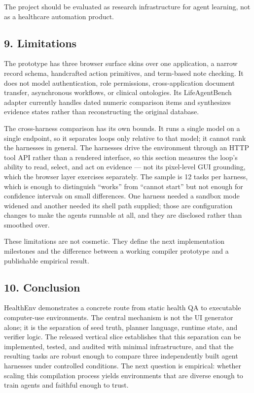 \documentclass[
]{article}
\begin{document}
The project should be evaluated as research infrastructure for agent
learning, not as a healthcare automation product.

\subsection{9. Limitations}\label{limitations}

The prototype has three browser surface skins over one application, a
narrow record schema, handcrafted action primitives, and term-based note
checking. It does not model authentication, role permissions,
cross-application document transfer, asynchronous workflows, or clinical
ontologies. Its LifeAgentBench adapter currently handles dated numeric
comparison items and synthesizes evidence states rather than
reconstructing the original database.

The cross-harness comparison has its own bounds. It runs a single model
on a single endpoint, so it separates loops only relative to that model;
it cannot rank the harnesses in general. The harnesses drive the
environment through an HTTP tool API rather than a rendered interface,
so this section measures the loop's ability to read, select, and act on
evidence --- not its pixel-level GUI grounding, which the browser layer
exercises separately. The sample is 12 tasks per harness, which is
enough to distinguish ``works'' from ``cannot start'' but not enough for
confidence intervals on small differences. One harness needed a sandbox
mode widened and another needed its shell path supplied; those are
configuration changes to make the agents runnable at all, and they are
disclosed rather than smoothed over.

These limitations are not cosmetic. They define the next implementation
milestones and the difference between a working compiler prototype and a
publishable empirical result.

\subsection{10. Conclusion}\label{conclusion}

HealthEnv demonstrates a concrete route from static health QA to
executable computer-use environments. The central mechanism is not the
UI generator alone; it is the separation of seed truth, planner
language, runtime state, and verifier logic. The released vertical slice
establishes that this separation can be implemented, tested, and audited
with minimal infrastructure, and that the resulting tasks are robust
enough to compare three independently built agent harnesses under
controlled conditions. The next question is empirical: whether scaling
this compilation process yields environments that are diverse enough to
train agents and faithful enough to trust.
\end{document}

